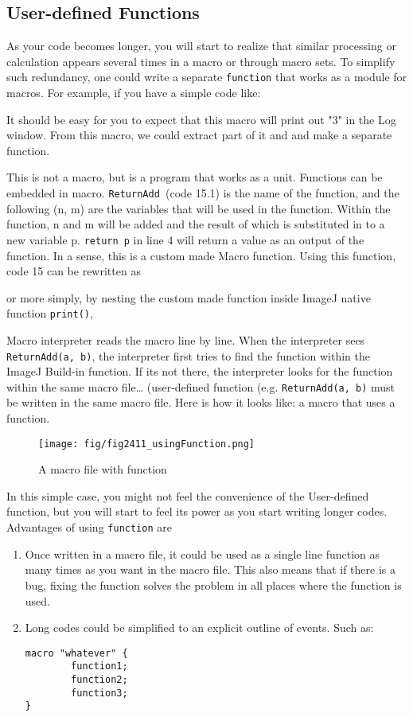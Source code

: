 \documentclass[11pt,a4paper,oneside]{report}
\newcommand{\ilcom}[1]{\texttt{\small#1}}
\begin{document}
\subsection{User-defined Functions}
As your code becomes longer, 
you will start to realize that similar processing or 
calculation appears several times in a macro or through macro sets. 
To simplify such redundancy, one could write a 
separate \ilcom{function} that works as a module for macros. 
For example, if you have a simple code like:

It should be easy for you to expect that this macro will print out "3" in the Log window. 
From this macro, we could extract part of it and and make a separate function. 

This is not a macro, but is a program that works as a unit. 
Functions can be embedded in macro. \ilcom{ReturnAdd }(code 15.1) is the name of the function, 
and the following (n, m) are the variables that will be used in the function. Within the function, 
n and m will be added and the result of which is substituted in to a new variable p. 
\ilcom{return p} in line 4 will return a value as an output of the function. 
In a sense, this is a custom made Macro function. Using this function, code 15 can be rewritten as

or more simply, by nesting the custom made function inside ImageJ native function \ilcom{print()},

Macro interpreter reads the macro line by line. When the interpreter sees \ilcom{ReturnAdd(a, b)}, 
the interpreter first tries to find the function within the ImageJ Build-in function. 
If its not there, the interpreter looks for the function within the same macro file\ldots 
(user-defined function (e.g. \ilcom{ReturnAdd(a, b)} must be written in the same macro file. 
Here is how it looks like: a macro that uses a function. 
\begin{figure}[htbp]
\begin{center}
\texttt{[image: fig/fig2411\_usingFunction.png]}
\caption{A macro file with function}
\label{fig:MacroWithFunction}
\end{center}
\end{figure} 

In this simple case, 
you might not feel the convenience of the User-defined function, 
but you will start to feel its power as you start writing longer codes. 
Advantages of using \ilcom{function} are
\begin{enumerate} 
\item Once written in a macro file, it could be used as a single line function 
as many times as you want in the macro file. This also means that if there is a bug, 
fixing the function solves the problem in all places where the function is used.
\item Long codes could be simplified to an explicit outline of events. Such as:
\begin{lstlisting}[numbers=none]
macro "whatever" {
		function1;
		function2;
		function3;
}
\end{lstlisting}
\end{enumerate}
\end{document}
